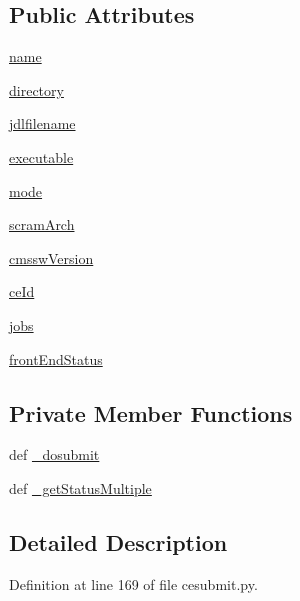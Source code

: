 \subsection*{Public Attributes}
\begin{DoxyCompactItemize}
\item 
\hyperlink{classcesubmit_1_1Task_a05a05a652fe678e897ec90fb3c9a4da6}{name}
\item 
\hyperlink{classcesubmit_1_1Task_a2cfde474eb274595ca1cce02f1e0b632}{directory}
\item 
\hyperlink{classcesubmit_1_1Task_a7163d12ce0e40c4479b05288f6d53411}{jdlfilename}
\item 
\hyperlink{classcesubmit_1_1Task_a5c27809386cdeaffd495829a3f346431}{executable}
\item 
\hyperlink{classcesubmit_1_1Task_a19285f65074058f8dcd56a7b3feb9e20}{mode}
\item 
\hyperlink{classcesubmit_1_1Task_a56c50586fa3366ae571fce3dd62d84a8}{scram\-Arch}
\item 
\hyperlink{classcesubmit_1_1Task_a0bf8a8d8c4c49df8c4f71964ce9fce68}{cmssw\-Version}
\item 
\hyperlink{classcesubmit_1_1Task_a9888ef44d84b3fdcd0ec8d95079eba5a}{ce\-Id}
\item 
\hyperlink{classcesubmit_1_1Task_acbe8ce4419b6f1b0106adc365b9b48a2}{jobs}
\item 
\hyperlink{classcesubmit_1_1Task_a659e4563ce34de5c1e9d5203a2e6851f}{front\-End\-Status}
\end{DoxyCompactItemize}
\subsection*{Private Member Functions}
\begin{DoxyCompactItemize}
\item 
def \hyperlink{classcesubmit_1_1Task_a1e06547f3c97e443e99d9e500287d46f}{\-\_\-dosubmit}
\item 
def \hyperlink{classcesubmit_1_1Task_a7ae331d7f15eb5bb2b43a6055d2cb7ae}{\-\_\-get\-Status\-Multiple}
\end{DoxyCompactItemize}


\subsection{Detailed Description}


Definition at line 169 of file cesubmit.\-py.



